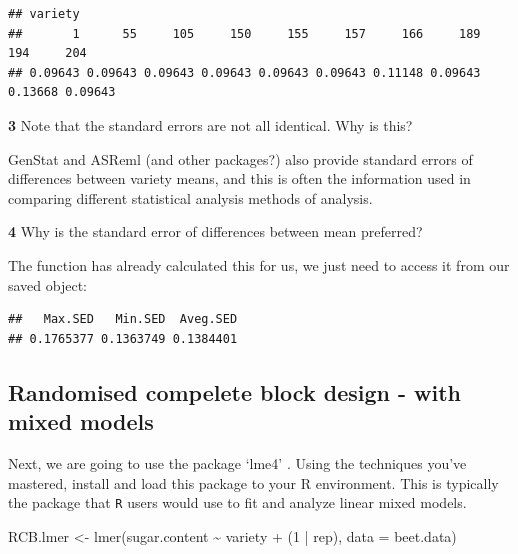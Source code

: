 \documentclass[
]{book}
\makeatletter
\newenvironment{Shaded}{\begin{snugshade}}{\end{snugshade}}
\newcommand{\AttributeTok}[1]{\textcolor[rgb]{0.77,0.63,0.00}{#1}}
\newcommand{\DecValTok}[1]{\textcolor[rgb]{0.00,0.00,0.81}{#1}}
\newcommand{\FunctionTok}[1]{\textcolor[rgb]{0.00,0.00,0.00}{#1}}
\newcommand{\NormalTok}[1]{#1}
\newcommand{\OtherTok}[1]{\textcolor[rgb]{0.56,0.35,0.01}{#1}}
\newcommand{\SpecialCharTok}[1]{\textcolor[rgb]{0.00,0.00,0.00}{#1}}
\newcommand{\StringTok}[1]{\textcolor[rgb]{0.31,0.60,0.02}{#1}}
\newenvironment{kframe}{%
\medskip{}
\setlength{\fboxsep}{.8em}
 \def\at@end@of@kframe{}%
 \ifinner\ifhmode%
  \def\at@end@of@kframe{\end{minipage}}%
  \begin{minipage}{\columnwidth}%
 \fi\fi%
 \def\FrameCommand##1{\hskip\@totalleftmargin \hskip-\fboxsep
 \colorbox{shadecolor}{##1}\hskip-\fboxsep
     \hskip-\linewidth \hskip-\@totalleftmargin \hskip\columnwidth}%
 \MakeFramed {\advance\hsize-\width
   \@totalleftmargin\z@ \linewidth\hsize
   \@setminipage}}%
 {\par\unskip\endMakeFramed%
 \at@end@of@kframe}
\newenvironment{rmdblock}[1]
  {
  \begin{itemize}
  \renewcommand{\labelitemi}{
    \raisebox{-.7\height}[0pt][0pt]{
      {\setkeys{Gin}{width=3em,keepaspectratio}\texttt{[image: images/\#1]}}
    }
  }
  \setlength{\fboxsep}{1em}
  \begin{kframe}
  \item
  }
  {
  \end{kframe}
  \end{itemize}
  }
\newenvironment{rmdquiz}
  {\begin{rmdblock}{quiz}}
  {\end{rmdblock}}
\makeatother
\begin{document}
\begin{verbatim}
## variety
##       1      55     105     150     155     157     166     189     194     204 
## 0.09643 0.09643 0.09643 0.09643 0.09643 0.09643 0.11148 0.09643 0.13668 0.09643
\end{verbatim}

\begin{rmdquiz}
\textbf{3} Note that the standard errors are not all identical. Why is this?
\end{rmdquiz}

GenStat and ASReml (and other packages?) also provide standard errors of differences between variety means, and this is often the information used in comparing different statistical analysis methods of analysis.

\begin{rmdquiz}
\textbf{4} Why is the standard error of differences between mean preferred?
\end{rmdquiz}

The function has already calculated this for us, we just need to access it from our saved object:

\begin{Shaded}
\end{Shaded}

\begin{verbatim}
##   Max.SED   Min.SED  Aveg.SED 
## 0.1765377 0.1363749 0.1384401
\end{verbatim}

\hypertarget{randomised-compelete-block-design---with-mixed-models}{%
\subsection{Randomised compelete block design - with mixed models}\label{randomised-compelete-block-design---with-mixed-models}}

Next, we are going to use the package `lme4' \citep{R-lme4}. Using the techniques you've mastered, install and load this package to your R environment. This is typically the package that \texttt{R} users would use to fit and analyze linear mixed models.

\begin{Shaded}
\begin{Highlighting}[]
\NormalTok{RCB.lmer }\OtherTok{\textless{}{-}} \FunctionTok{lmer}\NormalTok{(sugar.content }\SpecialCharTok{\textasciitilde{}}\NormalTok{ variety }\SpecialCharTok{+}\NormalTok{ (}\DecValTok{1} \SpecialCharTok{|}\NormalTok{ rep), }\AttributeTok{data =}\NormalTok{ beet.data)}
\end{Highlighting}
\end{Shaded}
\end{document}
